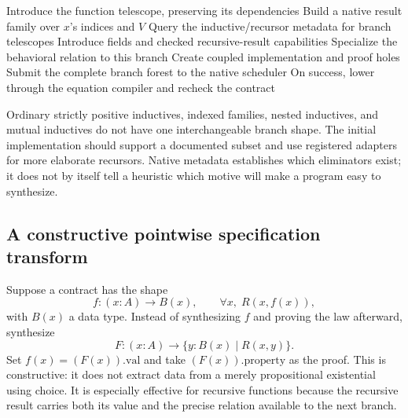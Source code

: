 \begin{algorithm}[ht]
\caption{Native structural recursive-sketch generation}
\label{alg:recursion}
\begin{algorithmic}[1]
 \State Introduce the function telescope, preserving its dependencies
     \State Build a native result family over $x$'s indices and $V$
     \State Query the inductive/recursor metadata for branch telescopes
       \State Introduce fields and checked recursive-result capabilities
       \State Specialize the behavioral relation to this branch
       \State Create coupled implementation and proof holes
     \EndFor
     \State Submit the complete branch forest to the native scheduler
     \State On success, lower through the equation compiler and recheck the contract
   \EndFor
 \EndFor
\EndFunction
\end{algorithmic}
\end{algorithm}

Ordinary strictly positive inductives, indexed families, nested inductives, and mutual inductives do not have one interchangeable branch shape. The initial implementation should support a documented subset and use registered adapters for more elaborate recursors. Native metadata establishes which eliminators exist; it does not by itself tell a heuristic which motive will make a program easy to synthesize.

\subsection{A constructive pointwise specification transform}

Suppose a contract has the shape
\[
 f:(x:A)\to B(x),\qquad \forall x,\;R(x,f(x)),
\]
with $B(x)$ a data type. Instead of synthesizing $f$ and proving the law afterward, synthesize
\begin{equation}\label{eq:pointwise}
 F:(x:A)\to\{y:B(x)\mid R(x,y)\}.
\end{equation}
Set $f(x)=(F(x)).\mathrm{val}$ and take $(F(x)).\mathrm{property}$ as the proof. This is constructive: it does not extract data from a merely propositional existential using choice. It is especially effective for recursive functions because the recursive result carries both its value and the precise relation available to the next branch.

